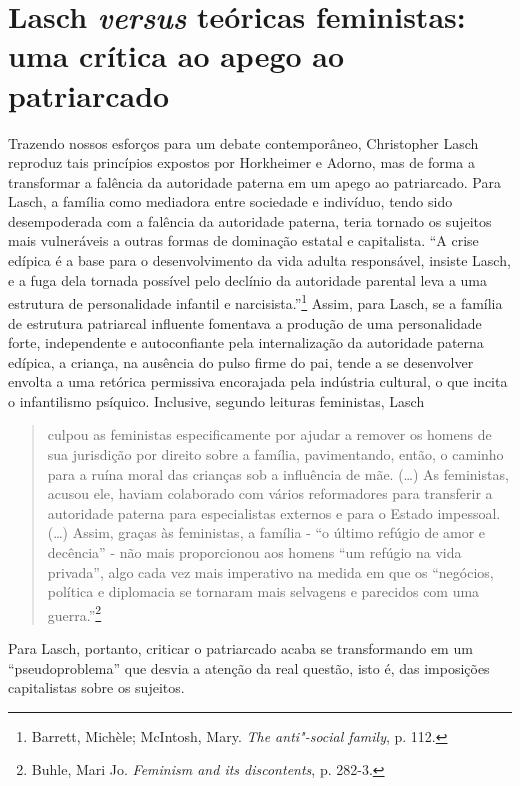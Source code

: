 \section{Lasch \emph{versus} teóricas feministas: uma crítica ao apego ao
patriarcado}

Trazendo nossos esforços para um debate contemporâneo, Christopher Lasch
reproduz tais princípios expostos por Horkheimer e Adorno, mas de forma
a transformar a falência da autoridade paterna em um apego ao
patriarcado. Para Lasch, a família como mediadora entre sociedade e
indivíduo, tendo sido desempoderada com a falência da autoridade
paterna, teria tornado os sujeitos mais vulneráveis a outras formas de
dominação estatal e capitalista. ``A crise edípica é a base para o
desenvolvimento da vida adulta responsável, insiste Lasch, e a fuga dela
tornada possível pelo declínio da autoridade parental leva a uma
estrutura de personalidade infantil e narcisista.''\footnote{Barrett,
  Michèle; McIntosh, Mary. \emph{The anti"-social family}, p. 112.}
Assim, para Lasch, se a família de estrutura patriarcal influente
fomentava a produção de uma personalidade forte, independente e
autoconfiante pela internalização da autoridade paterna edípica, a
criança, na ausência do pulso firme do pai, tende a se desenvolver
envolta a uma retórica permissiva encorajada pela indústria cultural, o
que incita o infantilismo psíquico. Inclusive, segundo leituras
feministas, Lasch

\begin{quote}
culpou as feministas especificamente por ajudar a remover os homens de
sua jurisdição por direito sobre a família, pavimentando, então, o
caminho para a ruína moral das crianças sob a influência de mãe. (\ldots{})
As feministas, acusou ele, haviam colaborado com vários reformadores
para transferir a autoridade paterna para especialistas externos e para
o Estado impessoal. (\ldots{}) Assim, graças às feministas, a família -
``o último refúgio de amor e decência'' - não mais proporcionou aos
homens ``um refúgio na vida privada'', algo cada vez mais imperativo na
medida em que os ``negócios, política e diplomacia se tornaram mais
selvagens e parecidos com uma guerra.''\footnote{Buhle, Mari Jo.
  \emph{Feminism and its discontents}, p. 282-3.}
\end{quote}

Para Lasch, portanto, criticar o patriarcado acaba se transformando em
um ``pseudoproblema'' que desvia a atenção da real questão, isto é, das
imposições capitalistas sobre os sujeitos.

